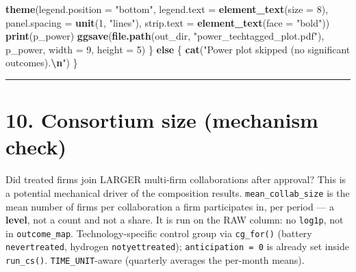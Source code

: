 \documentclass[
]{article}
\newenvironment{Shaded}{\begin{snugshade}}{\end{snugshade}}
\newcommand{\AttributeTok}[1]{\textcolor[rgb]{0.13,0.29,0.53}{#1}}
\newcommand{\ControlFlowTok}[1]{\textcolor[rgb]{0.13,0.29,0.53}{\textbf{#1}}}
\newcommand{\DecValTok}[1]{\textcolor[rgb]{0.00,0.00,0.81}{#1}}
\newcommand{\FunctionTok}[1]{\textcolor[rgb]{0.13,0.29,0.53}{\textbf{#1}}}
\newcommand{\NormalTok}[1]{#1}
\newcommand{\SpecialCharTok}[1]{\textcolor[rgb]{0.81,0.36,0.00}{\textbf{#1}}}
\newcommand{\StringTok}[1]{\textcolor[rgb]{0.31,0.60,0.02}{#1}}
\begin{document}
\begin{Shaded}
\begin{Highlighting}[]
    \FunctionTok{theme}\NormalTok{(}\AttributeTok{legend.position =} \StringTok{"bottom"}\NormalTok{,}
          \AttributeTok{legend.text  =} \FunctionTok{element\_text}\NormalTok{(}\AttributeTok{size =} \DecValTok{8}\NormalTok{),}
          \AttributeTok{panel.spacing =} \FunctionTok{unit}\NormalTok{(}\DecValTok{1}\NormalTok{, }\StringTok{"lines"}\NormalTok{),}
          \AttributeTok{strip.text   =} \FunctionTok{element\_text}\NormalTok{(}\AttributeTok{face =} \StringTok{"bold"}\NormalTok{))}
  \FunctionTok{print}\NormalTok{(p\_power)}
  \FunctionTok{ggsave}\NormalTok{(}\FunctionTok{file.path}\NormalTok{(out\_dir, }\StringTok{"power\_techtagged\_plot.pdf"}\NormalTok{),}
\NormalTok{         p\_power, }\AttributeTok{width =} \DecValTok{9}\NormalTok{, }\AttributeTok{height =} \DecValTok{5}\NormalTok{)}
\NormalTok{\} }\ControlFlowTok{else}\NormalTok{ \{}
  \FunctionTok{cat}\NormalTok{(}\StringTok{"Power plot skipped (no significant outcomes).}\SpecialCharTok{\textbackslash{}n}\StringTok{"}\NormalTok{)}
\NormalTok{\}}
\end{Highlighting}
\end{Shaded}

\begin{center}\rule{0.5\linewidth}{0.5pt}\end{center}

\section{10. Consortium size (mechanism
check)}\label{consortium-size-mechanism-check}

Did treated firms join LARGER multi-firm collaborations after approval?
This is a potential mechanical driver of the composition results.
\texttt{mean\_collab\_size} is the mean number of firms per
collaboration a firm participates in, per period --- a \textbf{level},
not a count and not a share. It is run on the RAW column: no
\texttt{log1p}, not in \texttt{outcome\_map}. Technology-specific
control group via \texttt{cg\_for()} (battery \texttt{nevertreated},
hydrogen \texttt{notyettreated}); \texttt{anticipation\ =\ 0} is already
set inside \texttt{run\_cs()}. \texttt{TIME\_UNIT}-aware (quarterly
averages the per-month means).
\end{document}
